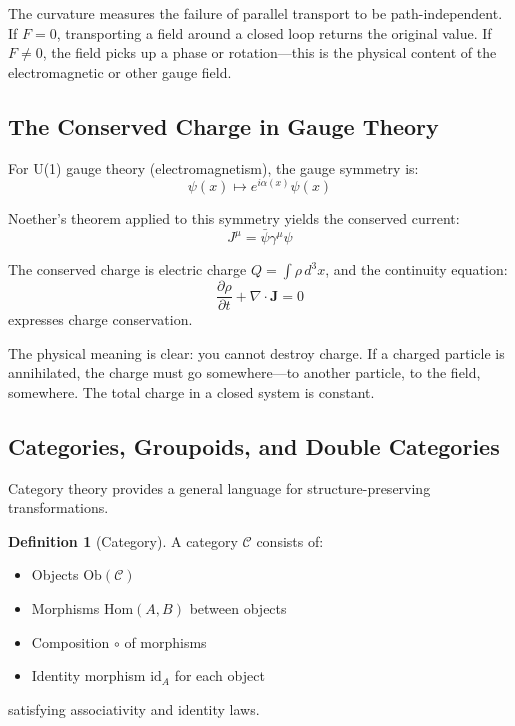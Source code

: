 \documentclass[12pt,letterpaper]{article}
\theoremstyle{definition}
\newtheorem{definition}[theorem]{Definition}
\theoremstyle{remark}
\begin{document}
The curvature measures the failure of parallel transport to be path-independent. If $F = 0$, transporting a field around a closed loop returns the original value. If $F \neq 0$, the field picks up a phase or rotation---this is the physical content of the electromagnetic or other gauge field.

\subsection{The Conserved Charge in Gauge Theory}

For U(1) gauge theory (electromagnetism), the gauge symmetry is:
\begin{equation}
\psi(x) \mapsto e^{i\alpha(x)} \psi(x)
\end{equation}

Noether's theorem applied to this symmetry yields the conserved current:
\begin{equation}
J^\mu = \bar{\psi} \gamma^\mu \psi
\end{equation}

The conserved charge is electric charge $Q = \int \rho \, d^3x$, and the continuity equation:
\begin{equation}
\frac{\partial \rho}{\partial t} + \nabla \cdot \mathbf{J} = 0
\end{equation}
expresses charge conservation.

The physical meaning is clear: you cannot destroy charge. If a charged particle is annihilated, the charge must go somewhere---to another particle, to the field, somewhere. The total charge in a closed system is constant.

\subsection{Categories, Groupoids, and Double Categories}

Category theory provides a general language for structure-preserving transformations.

\begin{definition}[Category]
A category $\mathcal{C}$ consists of:
\begin{itemize}
    \item Objects $\text{Ob}(\mathcal{C})$
    \item Morphisms $\text{Hom}(A, B)$ between objects
    \item Composition $\circ$ of morphisms
    \item Identity morphism $\text{id}_A$ for each object
\end{itemize}
satisfying associativity and identity laws.
\end{definition}
\end{document}
